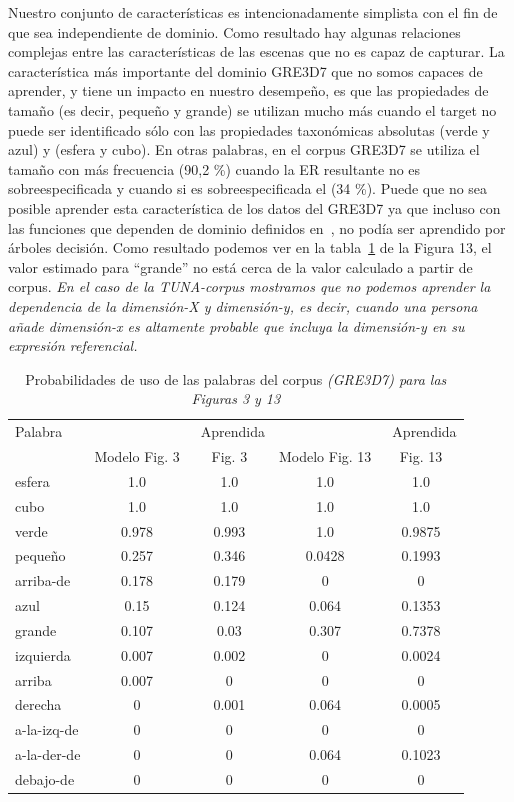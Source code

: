 Nuestro conjunto de caracter\'{i}sticas es intencionadamente simplista con el fin de que sea
independiente de dominio. Como resultado hay algunas relaciones complejas
entre las caracter\'{i}sticas de las escenas que no es capaz de
capturar. La caracter\'{i}stica m\'as importante del dominio GRE3D7
que no somos capaces de aprender, y tiene un impacto en nuestro desempe\~no, es que
las propiedades de tama\~no (es decir, peque\~no y grande) se utilizan mucho
m\'as cuando el target no puede ser identificado s\'olo con las propiedades taxon\'omicas absolutas 
(verde y azul) y (esfera y cubo). En otras palabras, en el corpus GRE3D7 se utiliza el tama\~no con m\'as frecuencia (90,2 \%)
cuando la ER resultante no es sobreespecificada y cuando si es sobreespecificada el (34 \%). 
Puede que no sea posible aprender esta caracter\'{i}stica de los
datos del GRE3D7 ya que incluso con las funciones que dependen de dominio definidos
en~\cite[Cap\'{i}tulo 6] {viet:gene11}, no pod\'{i}a ser aprendido por \'arboles decisi\'on. 
Como resultado podemos ver en la tabla~\ref{probability-of-use} de la Figura 13, el valor estimado para 
``grande'' no est\'a cerca de la
valor calculado a partir de corpus. \textit{En el caso de la TUNA-corpus
  mostramos que no podemos aprender la dependencia de la dimensi\'on-X y
  dimensi\'on-y, es decir, cuando una persona a\~nade dimensi\'on-x es altamente
  probable que incluya la dimensi\'on-y en su expresi\'on referencial.}

\begin{table}[h!]
\begin{center}
\begin{tabular}{|l|c|c|c|c|}
\hline
Palabra &  \puse 					& \puse\ Aprendida & \puse\    							& \puse\  Aprendida \\
        & Modelo Fig. 3   & Fig. 3   				& Modelo Fig. 13  			&  Fig. 13  \\
\hline
esfera & 1.0 & 1.0 & 1.0 & 1.0 \\
cubo & 1.0 & 1.0 & 1.0 & 1.0 \\
verde & 0.978 & 0.993 & 1.0 & 0.9875 \\
peque\~no & 0.257 & 0.346 & 0.0428 & 0.1993 \\
arriba-de & 0.178 & 0.179 & 0 & 0\\ 
azul & 0.15 & 0.124 & 0.064 & 0.1353 \\
grande & 0.107 & 0.03 & 0.307 & 0.7378 \\
izquierda & 0.007 & 0.002 & 0 & 0.0024 \\
arriba & 0.007 & 0 & 0 & 0 \\
derecha & 0 & 0.001 & 0.064 & 0.0005 \\
a-la-izq-de & 0 & 0 & 0 & 0 \\
a-la-der-de & 0 & 0 & 0.064 & 0.1023 \\
debajo-de & 0 & 0 & 0 & 0 \\
\hline
\end{tabular}
\caption{Probabilidades de uso de las palabras del corpus \textit{(GRE3D7) para las Figuras 3 y 13 } 
\label{probability-of-use}}
\end{center}
\end{table}

